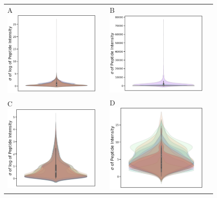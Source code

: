 \documentclass[11pt]{article}
\begin{document}
\begin{figure}[hbt]
    \centering
    \centering
    \begin{tabular}{lclc} 
        A \includegraphics[width=0.5\linewidth]{../../result/mu_sigma_variance_plots/osw_log/osw_violinOverlap_qvalFiltered_pepFiltered_qbinned.png} & &%
        B \includegraphics[width=0.5\linewidth]{../../result/mu_sigma_variance_plots/osw/osw_violinOverlap_nolog_qvalFiltered_pepFiltered_qbinned.png} & \\%
        C \includegraphics[width=0.5\linewidth]{../../result/mu_sigma_variance_plots/diann_log/diann_violinOverlap_qvalFiltered_pepFiltered_qbinned.png} & &%
        D \includegraphics[width=0.5\linewidth]{../../result/mu_sigma_variance_plots/diann/diann_violinOverlap_nolog_qvalFiltered_pepFiltered_qbinned.png} & \\%

\end{tabular}
\end{figure}
\end{document}
